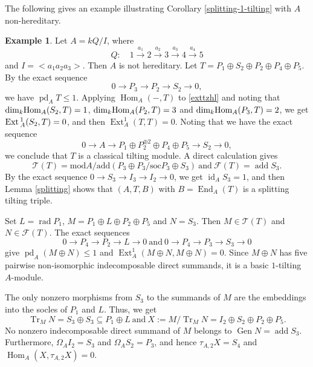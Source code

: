 \documentclass[reqno,12pt]{amsart}
\numberwithin{equation}{section}
\def\Ext{\mbox{\rm Ext}\,} \def\Hom{\mbox{\rm Hom}} \def\dim{\mbox{\rm dim}} \def\Iso{\mbox{\rm Iso}\,}
\theoremstyle{plain}
\theoremstyle{definition}
\newtheorem{example}[theorem]{\bf Example}
\begin{document}
The following gives an example illustrating Corollary \ref{splitting-1-tilting} with $A$ non-hereditary.

\begin{example}\label{nonhereditary-splitting-example}
Let $A=kQ/I$, where
\[
Q:\quad 1\overset{a_1}\longrightarrow2\overset{a_2}\longrightarrow3\overset{a_3}\longrightarrow4\overset{a_4}\longrightarrow5
\]
and $I=<a_1a_2a_3>$. Then $A$ is not hereditary. Let
$T=P_1\oplus S_2\oplus P_2\oplus P_4\oplus P_5$.
By the exact sequence
\begin{equation}\label{exttzhl}
0\longrightarrow P_3\longrightarrow P_2\longrightarrow S_2
\longrightarrow0,\end{equation}
we have $\operatorname{pd}_AT\leq1$. Applying $\operatorname{Hom}_A(-,T)$ to \eqref{exttzhl} and noting that
${\rm dim}_k\Hom_A(S_2,T)=1$, ${\rm dim}_k\Hom_A(P_2,T)=3$ and ${\rm dim}_k\Hom_A(P_3,T)=2$, we get $\Ext^1_A(S_2,T)=0$, and then $\operatorname{Ext}_A^1(T,T)=0$.
Noting that we have the exact sequence
\[
0\longrightarrow A\longrightarrow
P_1\oplus P_2^{\oplus2}\oplus P_4\oplus P_5
\longrightarrow S_2\longrightarrow0,
\]
we conclude that $T$ is a classical tilting
module. A direct calculation gives
\[
\mathcal{T}(T)=\text{mod}A/\text{add}(P_3\oplus P_3/\text{soc}P_3\oplus S_3)~\text{and}~ \mathcal{F}(T)=\operatorname{add}S_3.
\]
By the exact sequence
$0\to S_3\to I_3\to I_2
\to 0$,
we get $\operatorname{id}_AS_3=1$, and then Lemma
\ref{splitting} shows that $(A,T,B)$ with $B=\operatorname{End}_A(T)$
is a splitting tilting triple.

Set $L=\operatorname{rad}P_1$,
$M=P_1\oplus L\oplus P_2\oplus P_5$ and $N=S_3$. Then $M\in\mathcal{T}(T)$ and $N\in\mathcal{F}(T)$. The exact
sequences
\[
0\longrightarrow P_4\longrightarrow P_2\longrightarrow L
\longrightarrow0~\text{and}~
0\longrightarrow P_4\longrightarrow P_3\longrightarrow S_3
\longrightarrow0
\]
give $\operatorname{pd}_A(M\oplus N)\leq1$ and
$\operatorname{Ext}_A^1(M\oplus N,M\oplus N)=0$. Since $M\oplus N$
has five pairwise non-isomorphic indecomposable direct summands, it is a
basic $1$-tilting $A$-module.

The only nonzero morphisms from $S_3$ to the summands of $M$ are the embeddings
into the socles of $P_1$ and $L$. Thus, we get
\[
\operatorname{Tr}_MN
=S_3\oplus S_3\subseteq P_1\oplus L~\text{and}~
X:=M/\operatorname{Tr}_MN
=I_2\oplus S_2\oplus P_2\oplus P_5.
\]
No nonzero indecomposable direct summand of $M$ belongs to
$\operatorname{Gen}N=\operatorname{add}S_3$. Furthermore,
$\Omega_AI_2=S_3$ and $\Omega_AS_2=P_3$, and hence
$\tau_{A,2}X=S_4$ and
$\operatorname{Hom}_A(X,\tau_{A,2}X)=0$.


\end{example}
\end{document}
